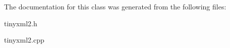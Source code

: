 The documentation for this class was generated from the following files\+:\begin{DoxyCompactItemize}
\item 
tinyxml2.\+h\item 
tinyxml2.\+cpp\end{DoxyCompactItemize}
